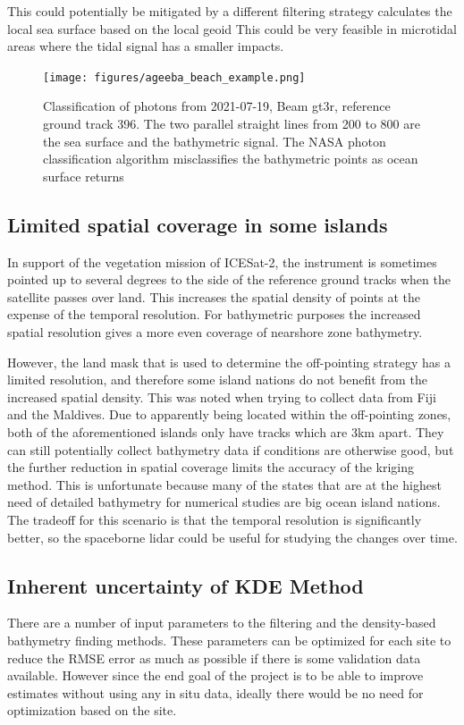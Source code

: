 This could potentially be mitigated by a different filtering strategy calculates the local sea surface based on the local geoid  This could be very feasible in microtidal areas where the tidal signal has a smaller impacts.

\begin{figure}[htbp]
    \centering
    \texttt{[image: figures/ageeba\_beach\_example.png]}
    \caption{Classification of photons from 2021-07-19, Beam gt3r, reference ground track 396. The two parallel straight lines from 200 to 800 are the sea surface and the bathymetric signal. The NASA photon classification algorithm misclassifies the bathymetric points as ocean surface returns}
    \label{fig:ageeba_bad_classes}
\end{figure}


\subsection{Limited spatial coverage in some islands}

In support of the vegetation mission of ICESat-2, the instrument is sometimes pointed up to several degrees to the side of the reference ground tracks when the satellite passes over land. This increases the spatial density of points at the expense of the temporal resolution. For bathymetric purposes the increased spatial resolution gives a more even  coverage of nearshore zone bathymetry. 

However, the land mask that is used to determine the off-pointing strategy has a limited resolution, and therefore some island nations do not benefit from the increased spatial density. This was noted when trying to collect data from Fiji and the Maldives. Due to apparently being located within the off-pointing zones, both of the aforementioned islands only have tracks which are 3km apart. They can still potentially collect bathymetry data if conditions are otherwise good, but the further reduction in spatial coverage limits the accuracy of the kriging method. This is unfortunate because many of the states that are at the highest need of detailed bathymetry for numerical studies are big ocean island nations. The tradeoff for this scenario is that the temporal resolution is significantly better, so the spaceborne lidar could be useful for studying the changes over time. 

\subsection{Inherent uncertainty of KDE Method}
There are a number of input parameters to the filtering and the density-based bathymetry finding methods. These parameters can be optimized for each site to reduce the RMSE error as much as possible if there is some validation data available. However since the end goal of the project is to be able to improve estimates without using any in situ data, ideally there would be no need for optimization based on the site.

